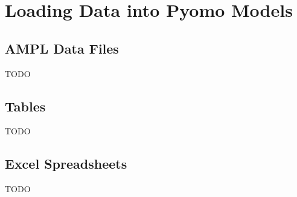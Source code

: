 \chapter{Loading Data into Pyomo Models}

\section{AMPL Data Files}

TODO

\section{Tables}

TODO

\section{Excel Spreadsheets}

TODO

